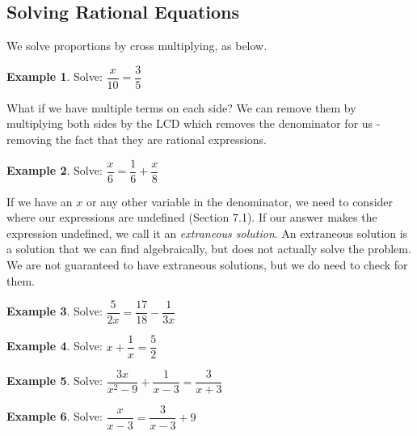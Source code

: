 \documentclass[addpoints,12pt]{exam}
\theoremstyle{definition}
\newtheorem{example}{Example}[subsection]
\begin{document}
\setcounter{section}{7}
\setcounter{subsection}{5}

\subsection{Solving Rational Equations}

We solve proportions by cross multiplying, as below.
\begin{example}
Solve: $\dfrac{x}{10} = \dfrac{3}{5}$
\vspace{1.5in}

\end{example}

What if we have multiple terms on each side? We can remove them by multiplying both sides by the LCD which removes the denominator for us - removing the fact that they are rational expressions.

\begin{example}
Solve: $\dfrac{x}{6} = \dfrac{1}{6} + \dfrac{x}{8}$
\vspace{2.5in}
\end{example}

If we have an $x$ or any other variable in the denominator, we need to consider where our expressions are undefined (Section 7.1). If our answer makes the expression undefined, we call it an \emph{extraneous solution}. An extraneous solution is a solution that we can find algebraically, but does not actually solve the problem. We are not guaranteed to have extraneous solutions, but we do need to check for them.

\newpage

\begin{example}
Solve: $\dfrac{5}{2x} = \dfrac{17}{18} - \dfrac{1}{3x}$
\vspace{3.5in}
\end{example}

\begin{example}
Solve: $x + \dfrac{1}{x} = \dfrac{5}{2}$
\end{example}

\newpage

\begin{example}
Solve: $\dfrac{3x}{x^2-9} + \dfrac{1}{x-3} = \dfrac{3}{x+3}$
\vspace{3.5in}
\end{example}

\begin{example}
Solve: $\dfrac{x}{x-3} = \dfrac{3}{x-3} + 9$
\end{example}
\end{document}

